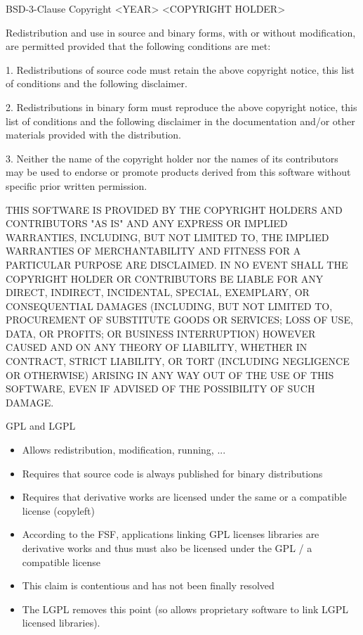 \documentclass[
  aspectratio=1610,
]{beamer}
\begin{document}
\begin{frame}[c]{BSD-3-Clause}
  \small
  Copyright <YEAR> <COPYRIGHT HOLDER>

  Redistribution and use in source and binary forms, with or without modification, are permitted provided that the following conditions are met:

  1. Redistributions of source code must retain the above copyright notice, this list of conditions and the following disclaimer.

  2. Redistributions in binary form must reproduce the above copyright notice, this list of conditions and the following disclaimer in the documentation and/or other materials provided with the distribution.

  3. Neither the name of the copyright holder nor the names of its contributors may be used to endorse or promote products derived from this software without specific prior written permission.

  \tiny
  THIS SOFTWARE IS PROVIDED BY THE COPYRIGHT HOLDERS AND CONTRIBUTORS "AS IS" AND ANY EXPRESS OR IMPLIED WARRANTIES, INCLUDING, BUT NOT LIMITED TO, THE IMPLIED WARRANTIES OF MERCHANTABILITY AND FITNESS FOR A PARTICULAR PURPOSE ARE DISCLAIMED. IN NO EVENT SHALL THE COPYRIGHT HOLDER OR CONTRIBUTORS BE LIABLE FOR ANY DIRECT, INDIRECT, INCIDENTAL, SPECIAL, EXEMPLARY, OR CONSEQUENTIAL DAMAGES (INCLUDING, BUT NOT LIMITED TO, PROCUREMENT OF SUBSTITUTE GOODS OR SERVICES; LOSS OF USE, DATA, OR PROFITS; OR BUSINESS INTERRUPTION) HOWEVER CAUSED AND ON ANY THEORY OF LIABILITY, WHETHER IN CONTRACT, STRICT LIABILITY, OR TORT (INCLUDING NEGLIGENCE OR OTHERWISE) ARISING IN ANY WAY OUT OF THE USE OF THIS SOFTWARE, EVEN IF ADVISED OF THE POSSIBILITY OF SUCH DAMAGE.
\end{frame}

\begin{frame}[c]{GPL and LGPL}
  \begin{itemize}
    \item Allows redistribution, modification, running, ...
    \item Requires that source code is always published for binary distributions
    \item Requires that derivative works are licensed under the same or a compatible license (copyleft)
    \item According to the FSF, applications linking GPL licenses libraries are derivative works and thus must also
      be licensed under the GPL / a compatible license
    \item This claim is contentious and has not been finally resolved
    \item The LGPL removes this point (so allows proprietary software to link LGPL licensed libraries).
  \end{itemize}
\end{frame}
\end{document}
